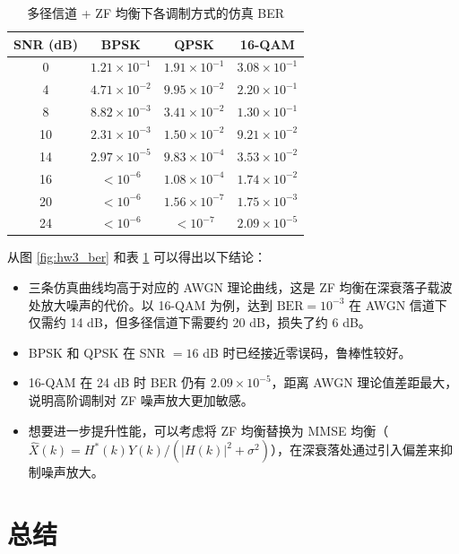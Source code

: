 \documentclass[a4paper, 11pt]{ctexart}
\begin{document}
\begin{table}[H]
\centering
\caption{多径信道 + ZF 均衡下各调制方式的仿真 BER}
\label{tab:hw3_ber}
\begin{tabular}{cccc}
\toprule
SNR (dB) & BPSK & QPSK & 16-QAM \\
\midrule
0  & $1.21 \times 10^{-1}$ & $1.91 \times 10^{-1}$ & $3.08 \times 10^{-1}$ \\
4  & $4.71 \times 10^{-2}$ & $9.95 \times 10^{-2}$ & $2.20 \times 10^{-1}$ \\
8  & $8.82 \times 10^{-3}$ & $3.41 \times 10^{-2}$ & $1.30 \times 10^{-1}$ \\
10 & $2.31 \times 10^{-3}$ & $1.50 \times 10^{-2}$ & $9.21 \times 10^{-2}$ \\
14 & $2.97 \times 10^{-5}$ & $9.83 \times 10^{-4}$ & $3.53 \times 10^{-2}$ \\
16 & $<10^{-6}$ & $1.08 \times 10^{-4}$ & $1.74 \times 10^{-2}$ \\
20 & $<10^{-6}$ & $1.56 \times 10^{-7}$ & $1.75 \times 10^{-3}$ \\
24 & $<10^{-6}$ & $<10^{-7}$ & $2.09 \times 10^{-5}$ \\
\bottomrule
\end{tabular}
\end{table}

从图 \ref{fig:hw3_ber} 和表 \ref{tab:hw3_ber} 可以得出以下结论：

\begin{itemize}
    \item 三条仿真曲线均高于对应的 AWGN 理论曲线，这是 ZF 均衡在深衰落子载波处放大噪声的代价。以 16-QAM 为例，达到 $\text{BER} = 10^{-3}$ 在 AWGN 信道下仅需约 14 dB，但多径信道下需要约 20 dB，损失了约 6 dB。
    \item BPSK 和 QPSK 在 SNR $= 16$ dB 时已经接近零误码，鲁棒性较好。
    \item 16-QAM 在 24 dB 时 BER 仍有 $2.09 \times 10^{-5}$，距离 AWGN 理论值差距最大，说明高阶调制对 ZF 噪声放大更加敏感。
    \item 想要进一步提升性能，可以考虑将 ZF 均衡替换为 MMSE 均衡（$\hat{X}(k) = H^*(k) Y(k) / (|H(k)|^2 + \sigma^2)$），在深衰落处通过引入偏差来抑制噪声放大。
\end{itemize}

\section{总结}
\end{document}
